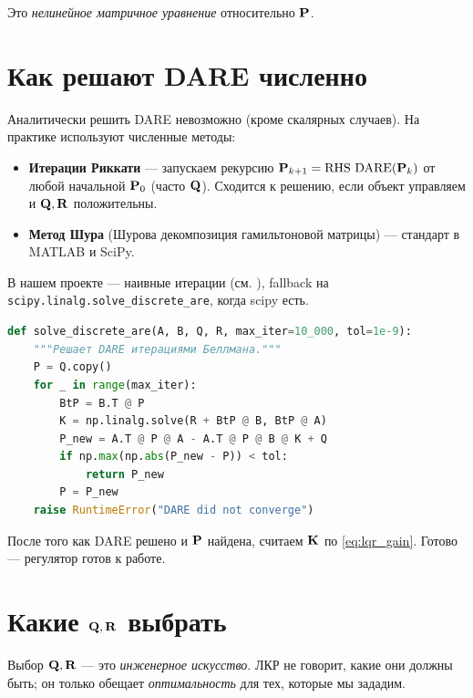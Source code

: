 Это \emph{нелинейное матричное уравнение} относительно $\mathbf{P}$.

\section{Как решают DARE численно}

\begin{notebox}
Аналитически решить DARE невозможно (кроме скалярных случаев). На практике
используют численные методы:

\begin{itemize}
  \item \textbf{Итерации Риккати} --- запускаем рекурсию
        $\mathbf{P}_{k+1} = \text{RHS DARE}(\mathbf{P}_k)$ от любой начальной
        $\mathbf{P}_0$ (часто $\mathbf{Q}$). Сходится к решению, если объект
        управляем и $\mathbf{Q}, \mathbf{R}$ положительны.
  \item \textbf{Метод Шура} (Шурова декомпозиция гамильтоновой матрицы) ---
        стандарт в MATLAB и SciPy.
\end{itemize}

В нашем проекте --- наивные итерации (см. ),
fallback на \texttt{scipy.linalg.solve\_discrete\_are}, когда scipy есть.
\end{notebox}

\begin{codebox}[title={\filepath{pi\_nodes/control/\_linalg.py}, функция \texttt{solve\_discrete\_are}}]
\begin{lstlisting}[language=Python]
def solve_discrete_are(A, B, Q, R, max_iter=10_000, tol=1e-9):
    """Решает DARE итерациями Беллмана."""
    P = Q.copy()
    for _ in range(max_iter):
        BtP = B.T @ P
        K = np.linalg.solve(R + BtP @ B, BtP @ A)
        P_new = A.T @ P @ A - A.T @ P @ B @ K + Q
        if np.max(np.abs(P_new - P)) < tol:
            return P_new
        P = P_new
    raise RuntimeError("DARE did not converge")
\end{lstlisting}
\end{codebox}

После того как DARE решено и $\mathbf{P}$ найдена, считаем
$\mathbf{K}$ по \eqref{eq:lqr_gain}. Готово --- регулятор готов к работе.

\section{Какие $\mathbf{Q}, \mathbf{R}$ выбрать}

\begin{ideabox}
Выбор $\mathbf{Q}, \mathbf{R}$ --- это \emph{инженерное искусство}. ЛКР не
говорит, какие они должны быть; он только обещает \emph{оптимальность}
для тех, которые мы зададим.
\end{ideabox}

